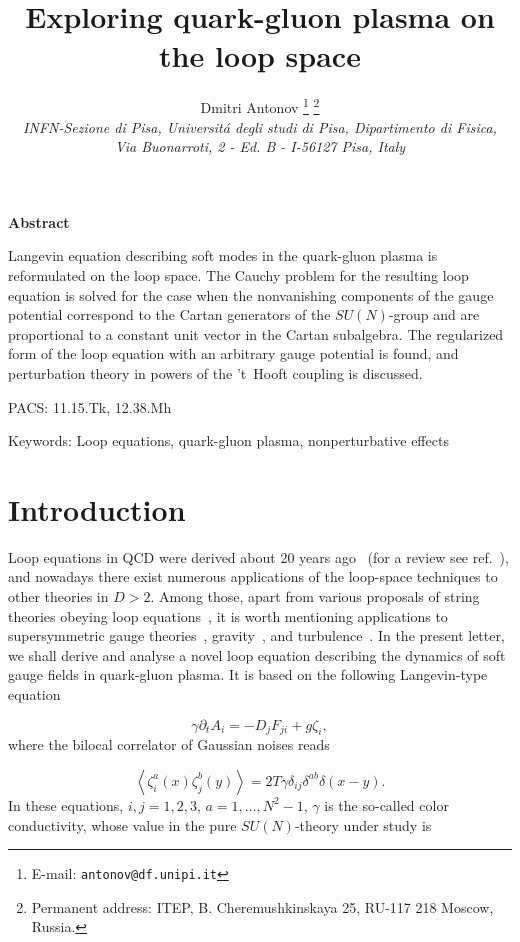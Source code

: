 \documentclass[a4paper,12pt]{article}
\title{
\vspace{-3mm}
\rightline{\small IFUP-TH 2002/29}
\vspace{8mm}
\bf Exploring quark-gluon plasma on the loop space}
\author{
Dmitri Antonov \thanks{
E-mail: {\tt antonov@df.unipi.it}}
\thanks{Permanent address:
ITEP, B. Cheremushkinskaya 25, RU-117 218 Moscow, Russia.}\\
{\it INFN-Sezione di Pisa, Universit\'a degli studi di Pisa,
Dipartimento di Fisica,}\\
{\it Via Buonarroti, 2 - Ed. B -
I-56127 Pisa, Italy}}
\date{}
\begin{document}

\maketitle
\vspace{1mm}
\centerline{\bf {Abstract}}
\vspace{3mm}
\noindent
Langevin equation describing soft modes in the quark-gluon plasma is reformulated on the
loop space. The Cauchy problem for the resulting loop equation is solved for the
case when the nonvanishing components of the gauge potential correspond to the Cartan generators
of the $SU(N)$-group and are proportional to a constant unit vector in the Cartan subalgebra.
The regularized form of the loop equation with an arbitrary gauge potential
is found, and perturbation theory in powers of the
't~Hooft coupling is discussed.

\vspace{5mm}
\noindent
PACS: 11.15.Tk, 12.38.Mh

\vspace{5mm}
\noindent
Keywords: Loop equations, quark-gluon plasma, nonperturbative effects

\vspace{10mm}

\section{Introduction}
Loop equations in QCD were derived about 20 years ago~\cite{le} (for a review see ref.~\cite{rev}),
and nowadays there exist numerous applications of the loop-space techniques to other theories in $D>2$. Among those, apart from
various proposals of string theories obeying loop equations~\cite{str, dgo}, it is worth mentioning
applications to supersymmetric gauge theories~\cite{dgo, susy}, gravity~\cite{gravity}, and
turbulence~\cite{tur1, tur2}. In the present letter, we shall derive and analyse a novel loop equation
describing the dynamics of soft gauge fields in quark-gluon plasma. It is based on the following Langevin-type
equation~\cite{bod}

\begin{equation}
\label{1}
\gamma\partial_t A_i=-D_jF_{ji}+g\zeta_i,
\end{equation}
where the bilocal correlator of
Gaussian noises reads

\begin{equation}
\label{cO}
\left<\zeta_i^a(x)\zeta_j^b(y)\right>=2T\gamma\delta_{ij}\delta^{ab}\delta(x-y).
\end{equation}
In these equations, $i,j=1,2,3$, $a=1,\ldots,N^2-1$, $\gamma$ is the so-called color conductivity,
whose value in the pure $SU(N)$-theory under study is~\cite{sg}
\end{document}

